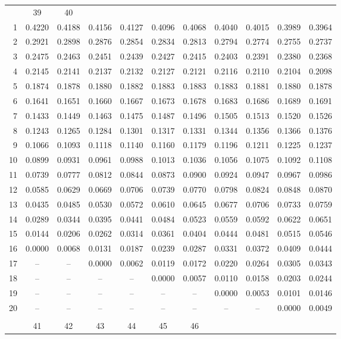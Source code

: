 \documentclass[draft]{article}
\begin{document}
\begin{table}
\begin{center}
\begin{tabular}{rcccccccccc}
  & \multicolumn{1}{c}{39} 
  & \multicolumn{1}{c}{40} \\ \cline{2-11}
 1&0.4220&0.4188&0.4156&0.4127&0.4096&0.4068&0.4040&0.4015&0.3989&0.3964\\
 2&0.2921&0.2898&0.2876&0.2854&0.2834&0.2813&0.2794&0.2774&0.2755&0.2737\\
 3&0.2475&0.2463&0.2451&0.2439&0.2427&0.2415&0.2403&0.2391&0.2380&0.2368\\
 4&0.2145&0.2141&0.2137&0.2132&0.2127&0.2121&0.2116&0.2110&0.2104&0.2098\\
 5&0.1874&0.1878&0.1880&0.1882&0.1883&0.1883&0.1883&0.1881&0.1880&0.1878\\
 6&0.1641&0.1651&0.1660&0.1667&0.1673&0.1678&0.1683&0.1686&0.1689&0.1691\\
 7&0.1433&0.1449&0.1463&0.1475&0.1487&0.1496&0.1505&0.1513&0.1520&0.1526\\
 8&0.1243&0.1265&0.1284&0.1301&0.1317&0.1331&0.1344&0.1356&0.1366&0.1376\\
 9&0.1066&0.1093&0.1118&0.1140&0.1160&0.1179&0.1196&0.1211&0.1225&0.1237\\
10&0.0899&0.0931&0.0961&0.0988&0.1013&0.1036&0.1056&0.1075&0.1092&0.1108\\
11&0.0739&0.0777&0.0812&0.0844&0.0873&0.0900&0.0924&0.0947&0.0967&0.0986\\
12&0.0585&0.0629&0.0669&0.0706&0.0739&0.0770&0.0798&0.0824&0.0848&0.0870\\
13&0.0435&0.0485&0.0530&0.0572&0.0610&0.0645&0.0677&0.0706&0.0733&0.0759\\
14&0.0289&0.0344&0.0395&0.0441&0.0484&0.0523&0.0559&0.0592&0.0622&0.0651\\
15&0.0144&0.0206&0.0262&0.0314&0.0361&0.0404&0.0444&0.0481&0.0515&0.0546\\
16&0.0000&0.0068&0.0131&0.0187&0.0239&0.0287&0.0331&0.0372&0.0409&0.0444\\
17&  --  &  --  &0.0000&0.0062&0.0119&0.0172&0.0220&0.0264&0.0305&0.0343\\
18&  --  &  --  &  --  &  --  &0.0000&0.0057&0.0110&0.0158&0.0203&0.0244\\
19&  --  &  --  &  --  &  --  &  --  &  --  &0.0000&0.0053&0.0101&0.0146\\
20&  --  &  --  &  --  &  --  &  --  &  --  &  --  &  --  &0.0000&0.0049\\
\\
  & \multicolumn{1}{c}{41} 
  & \multicolumn{1}{c}{42} 
  & \multicolumn{1}{c}{43} 
  & \multicolumn{1}{c}{44} 
  & \multicolumn{1}{c}{45} 
  & \multicolumn{1}{c}{46} 

\end{tabular}
\end{center}
\end{table}
\end{document}
